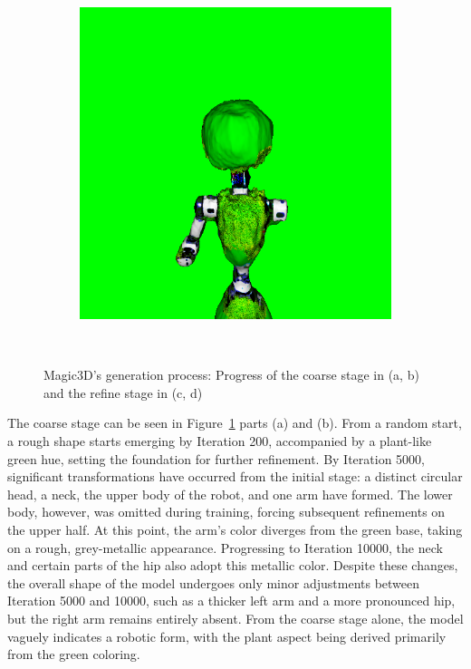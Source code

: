 \begin{figure}[H]
\begin{subfigure}[b]{0.2\textwidth}
        \includegraphics[width=\textwidth]{etc/a robot made out of plants/magic3d/magic3D_refine_robot_10000_part1.png}
        \caption{}
    \end{subfigure}
    \caption{Magic3D's generation process: Progress of the coarse stage in (a, b) and the refine stage in (c, d)}~\label{fig:generationMagic3D}
\end{figure} 

The coarse stage can be seen in Figure~\ref{fig:generationMagic3D} parts (a) and (b). From a random start, a rough shape starts emerging by Iteration 200, accompanied by a plant-like green hue, setting the foundation for further refinement. By Iteration 5000, significant transformations have occurred from the initial stage: a distinct circular head, a neck, the upper body of the robot, and one arm have formed. The lower body, however, was omitted during training, forcing subsequent refinements on the upper half. At this point, the arm's color diverges from the green base, taking on a rough, grey-metallic appearance. Progressing to Iteration 10000, the neck and certain parts of the hip also adopt this metallic color. Despite these changes, the overall shape of the model undergoes only minor adjustments between Iteration 5000 and 10000, such as a thicker left arm and a more pronounced hip, but the right arm remains entirely absent. From the coarse stage alone, the model vaguely indicates a robotic form, with the plant aspect being derived primarily from the green coloring.

